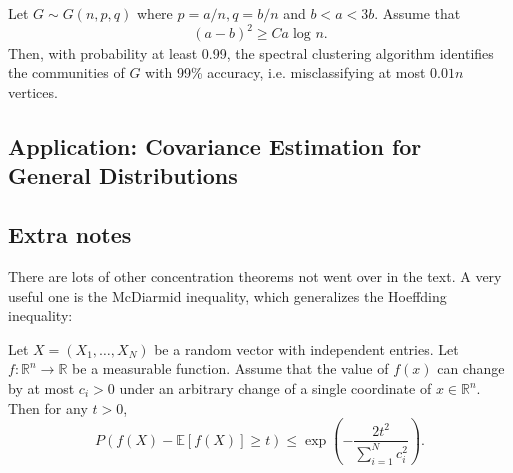 \begin{theorem}
\label{thm:5.5.1}
Let $G \sim G(n, p, q)$ where $p = a/n, q = b/n$ and $b < a < 3b$. Assume that 
\[ (a - b)^2 \geq Ca \log_{}{n}. \]
Then, with probability at least 0.99, the spectral clustering algorithm identifies the communities of $G$ 
with 99\% accuracy, i.e. misclassifying at most $0.01n$ vertices.
\end{theorem}


\subsection{Application: Covariance Estimation for General Distributions}



\subsection{Extra notes}
There are lots of other concentration theorems not went over in the text. A very useful one is the McDiarmid 
inequality, which generalizes the Hoeffding inequality:

\begin{theorem}
\label{thm:5.7.1}
Let $X = (X_1, \dots, X_N)$ be a random vector with independent entries. Let $f: \mathbb{R}^n \to \mathbb{R}$ 
be a measurable function. Assume that the value of $f(x)$ can change by at most $c_i > 0$ under an arbitrary 
change of a single coordinate of $x \in \mathbb{R}^n$. Then for any $t > 0$, 
\[ P(f(X) - \mathbb{E}[f(X)] \geq t) \leq \exp{\left( -\frac{2t^2}{\sum_{i = 1}^{N}c_i^2} \right)}. \]
\end{theorem}
